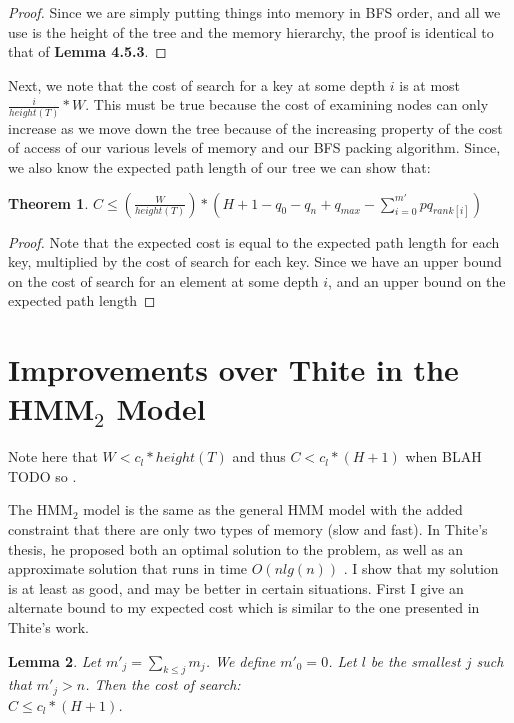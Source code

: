 \documentclass[letterpaper,12pt,titlepage,oneside,final]{book}
\theoremstyle{plain}
\newtheorem{thm}{Theorem}[section]
\newtheorem{lem}[thm]{Lemma}
\begin{document}
\begin{proof}
Since we are simply putting things into memory in BFS order, and all we use is the height of the tree and the memory hierarchy, the proof is identical to that of \textbf{Lemma 4.5.3}.
\end{proof}

Next, we note that the cost of search for a key at some depth $i$ is at most $\frac{i}{height(T)}* W$. This must be true because the cost of examining nodes can only increase as we move down the tree because of the increasing property of the cost of access of our various levels of memory and our BFS packing algorithm. Since, we also know the expected path length of our tree we can show that: \\

\begin{thm}
$C \leq  (\frac{W}{height(T)}) * (H + 1 - q_0 - q_n + q_{max} - \sum_{i=0}^{m'} pq_{rank[i]})$
\end{thm}

\begin{proof}
Note that the expected cost is equal to the expected path length for each key, multiplied by the cost of search for each key. Since we have an upper bound on the cost of search for an element at some depth $i$, and an upper bound on the expected path length
\end{proof}


\section{Improvements over Thite in the HMM$_2$ Model}

Note here that $W < c_l*height(T)$ and thus $C < c_l*(H+1)$ when BLAH TODO so .

The HMM$_2$ model is the same as the general HMM model with the added constraint that there are only two types of memory (slow and fast). In Thite's thesis, he proposed both an optimal solution to the problem, as well as an approximate solution that runs in time $O(n lg(n))$ \cite{thite2008optimum}. I show that my solution is at least as good, and may be better in certain situations. First I give an alternate bound to my expected cost which is similar to the one presented in Thite's work.

\begin{lem}
Let $m'_j = \sum_{k \leq j} m_j$. We define $m'_0 = 0$. Let $l$ be the smallest $j$ such that $m'_j > n$. Then the cost of search: \\
$C \leq  c_l * (H + 1)$.
\end{lem}
\end{document}
